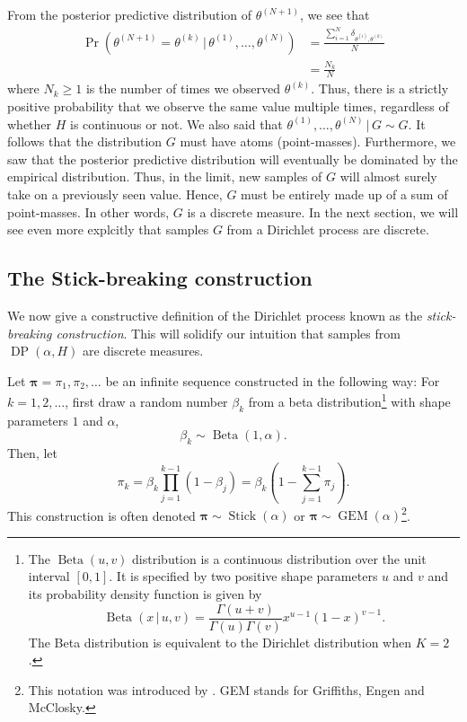\documentclass[final,3p,times,twocolumn]{elsarticle}
\DeclareMathOperator*{\DP}{DP}
\DeclareMathOperator*{\Beta}{Beta}
\DeclareMathOperator*{\GEM}{GEM}
\DeclareMathOperator*{\Stick}{Stick}
\let\bs\boldsymbol
\begin{document}
From the posterior predictive distribution of $\theta^{(N+1)}$, we see that
\begin{equation}
\label{eqn:dpprobsame}
\begin{split}
\Pr(\theta^{(N+1)} = \theta^{(k)} \,|\,\theta^{(1)},\dots,\theta^{(N)}) &= \frac{\sum_{i=1}^N \delta_{\theta^{(i)},\theta^{(k)}}}{N}\\
&= \frac{N_k}{N}
\end{split}
\end{equation}
where $N_k \geq 1$ is the number of times we observed $\theta^{(k)}$.
Thus, there is a strictly positive probability that we observe the same value multiple times, regardless of whether $H$ is continuous or not.
We also said that $\theta^{(1)},\dots,\theta^{(N)} \,|\,G \sim G$.
It follows that the distribution $G$ must have atoms (point-masses).
Furthermore, we saw that the posterior predictive distribution will eventually be dominated by the empirical distribution.
Thus, in the limit, new samples of $G$ will almost surely take on a previously seen value. 
Hence, $G$ must be entirely made up of a sum of point-masses. 
In other words, $G$ is a discrete measure.
In the next section, we will see even more explcitly that samples $G$ from a Dirichlet process are discrete.

\subsection{The Stick-breaking construction}
We now give a constructive definition of the Dirichlet process known as the \emph{stick-breaking construction}.
This will solidify our intuition that samples from $\DP(\alpha,H)$ are discrete measures.

Let $\bs \pi = {\pi_1,\pi_2,\dots}$ be an infinite sequence constructed in the following way:
For $k=1,2,\dots$, first draw a random number $\beta_k$ from a beta distribution\footnote{The $\Beta(u,v)$ distribution is a continuous distribution over the unit interval $[0,1]$. It is specified by two positive shape parameters $u$ and $v$ and its probability density function is given by
\[
\Beta(x\,|\,u,v) = \frac{\Gamma(u+v)}{\Gamma(u)\Gamma(v)}x^{u-1}(1-x)^{v-1}.
\]
The Beta distribution is equivalent to the Dirichlet distribution when $K=2$.}
with shape parameters $1$ and $\alpha$,
\begin{equation*}
\beta_k \sim \Beta(1,\alpha).
\end{equation*}
Then, let
\begin{equation*}
\pi_k = \beta_k \prod_{j=1}^{k-1} (1-\beta_j) = \beta_k (1 - \sum_{j=1}^{k-1} \pi_j).
\end{equation*}
This construction is often denoted $\bs \pi \sim \Stick(\alpha)$ or $\bs \pi \sim \GEM(\alpha)$\footnote{
This notation was introduced by \cite{ewens1990}.
GEM stands for Griffiths, Engen and McClosky.}.
\end{document}
